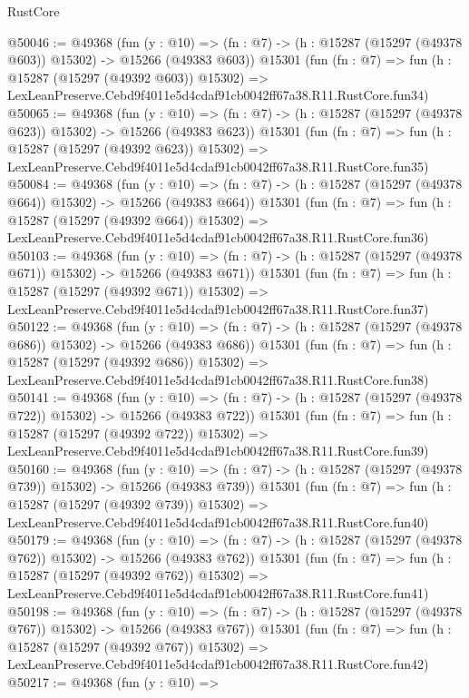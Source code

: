 \begin{lexlean}{RustCore}
\begin{coremodule}
@50046 := @49368
    (fun (y : @10) =>
    (fn : @7) -> (h : @15287 (@15297 (@49378 @603)) @15302) -> @15266 (@49383 @603))
    @15301
    (fun (fn : @7) =>
    fun (h : @15287 (@15297 (@49392 @603)) @15302) =>
    LexLeanPreserve.Cebd9f4011e5d4cdaf91cb0042ff67a38.R11.RustCore.fun34)
@50065 := @49368
    (fun (y : @10) =>
    (fn : @7) -> (h : @15287 (@15297 (@49378 @623)) @15302) -> @15266 (@49383 @623))
    @15301
    (fun (fn : @7) =>
    fun (h : @15287 (@15297 (@49392 @623)) @15302) =>
    LexLeanPreserve.Cebd9f4011e5d4cdaf91cb0042ff67a38.R11.RustCore.fun35)
@50084 := @49368
    (fun (y : @10) =>
    (fn : @7) -> (h : @15287 (@15297 (@49378 @664)) @15302) -> @15266 (@49383 @664))
    @15301
    (fun (fn : @7) =>
    fun (h : @15287 (@15297 (@49392 @664)) @15302) =>
    LexLeanPreserve.Cebd9f4011e5d4cdaf91cb0042ff67a38.R11.RustCore.fun36)
@50103 := @49368
    (fun (y : @10) =>
    (fn : @7) -> (h : @15287 (@15297 (@49378 @671)) @15302) -> @15266 (@49383 @671))
    @15301
    (fun (fn : @7) =>
    fun (h : @15287 (@15297 (@49392 @671)) @15302) =>
    LexLeanPreserve.Cebd9f4011e5d4cdaf91cb0042ff67a38.R11.RustCore.fun37)
@50122 := @49368
    (fun (y : @10) =>
    (fn : @7) -> (h : @15287 (@15297 (@49378 @686)) @15302) -> @15266 (@49383 @686))
    @15301
    (fun (fn : @7) =>
    fun (h : @15287 (@15297 (@49392 @686)) @15302) =>
    LexLeanPreserve.Cebd9f4011e5d4cdaf91cb0042ff67a38.R11.RustCore.fun38)
@50141 := @49368
    (fun (y : @10) =>
    (fn : @7) -> (h : @15287 (@15297 (@49378 @722)) @15302) -> @15266 (@49383 @722))
    @15301
    (fun (fn : @7) =>
    fun (h : @15287 (@15297 (@49392 @722)) @15302) =>
    LexLeanPreserve.Cebd9f4011e5d4cdaf91cb0042ff67a38.R11.RustCore.fun39)
@50160 := @49368
    (fun (y : @10) =>
    (fn : @7) -> (h : @15287 (@15297 (@49378 @739)) @15302) -> @15266 (@49383 @739))
    @15301
    (fun (fn : @7) =>
    fun (h : @15287 (@15297 (@49392 @739)) @15302) =>
    LexLeanPreserve.Cebd9f4011e5d4cdaf91cb0042ff67a38.R11.RustCore.fun40)
@50179 := @49368
    (fun (y : @10) =>
    (fn : @7) -> (h : @15287 (@15297 (@49378 @762)) @15302) -> @15266 (@49383 @762))
    @15301
    (fun (fn : @7) =>
    fun (h : @15287 (@15297 (@49392 @762)) @15302) =>
    LexLeanPreserve.Cebd9f4011e5d4cdaf91cb0042ff67a38.R11.RustCore.fun41)
@50198 := @49368
    (fun (y : @10) =>
    (fn : @7) -> (h : @15287 (@15297 (@49378 @767)) @15302) -> @15266 (@49383 @767))
    @15301
    (fun (fn : @7) =>
    fun (h : @15287 (@15297 (@49392 @767)) @15302) =>
    LexLeanPreserve.Cebd9f4011e5d4cdaf91cb0042ff67a38.R11.RustCore.fun42)
@50217 := @49368
    (fun (y : @10) =>

\end{coremodule}
\end{lexlean}
